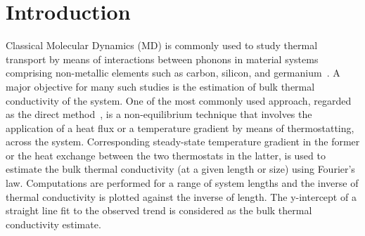 \section{Introduction}
\label{sec:intro}

\begin{comment}
1. Background on use of MD simulations for thermal transport, preferred for studying
thermal transport by phononic interactions (refer notes from book suggested by Amuthan)


2. One approach to NEMD is the Direct Method, commonly used for estimating the bulk
thermal conductivity. A brief discussion on the direct method and associated pros and cons
(notes from Dellan's paper and book suggested by Amuthan) 
Predictions impacted by the choice of potential, values of
individual parameters, size, and potentially due to duration and applied thermal gradients
(cite Amuthan book, Francesco's paper, McGaughey's paper). 
Errors are introduced by thermostatting (Amuthan book). Nominal value of SW potential parameters
based on fitting against experiments and to ensure structural stability etc. (SW paper)

3. Motivate uncertainty analysis and briefly discuss and cite recent efforts (Francesco, Kirby,
Murthy). Highlight focus and key contributions of the present work and how it differs from
those efforts. 

4. Section-wise overview of the paper.  
\end{comment}

Classical Molecular Dynamics (MD) is commonly used to study thermal transport by means of
interactions between phonons in material systems comprising non-metallic elements such
as carbon, silicon, and germanium~\cite{Dumitrica:2010}. 
A major objective for many such studies is the
estimation of bulk thermal conductivity of the system. One of the most commonly used approach,
regarded as the direct method~\cite{Schelling:2002,Turney:2009,Zhou:2009,Landry:2009,
McGaughey:2006,Ni:2009,Shi:2009,Wang:2009,Papanikolaou:2008}, is a non-equilibrium
technique that involves the application
of a heat flux or a temperature gradient by means of thermostatting, across the system. 
Corresponding steady-state temperature gradient in the former or the heat exchange between
the two thermostats in the latter, is used to estimate the bulk thermal conductivity (at a given
length or size) using 
Fourier's law. Computations are performed for a range of system lengths and the inverse
of thermal conductivity is plotted against the inverse of length. The y-intercept of a
straight line fit to the observed trend is considered as the bulk thermal conductivity 
estimate. 

